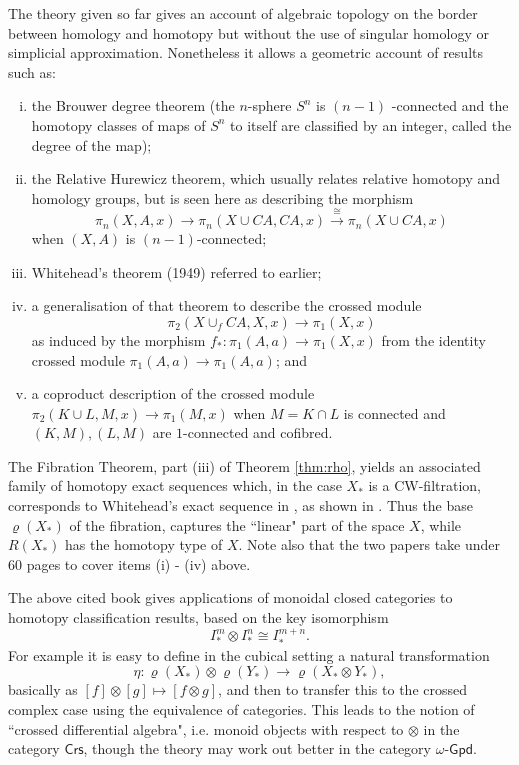 \documentclass{elsarticle}
\def\Crs{\mathsf{Crs}}
\def\Crs{\mathsf{Crs}}
\def\Crs{\mathsf{Crs}}
\def\rho{\varrho}
\def\ogpd{$\omega$-$\mathsf{Gpd}$}
\begin{document}
The theory given so far gives an account of algebraic topology on the border between
homology and homotopy but without the use of singular homology or simplicial approximation.
Nonetheless it allows a geometric account of results such as:
\begin{enumerate}[(i)]
\item  the Brouwer degree theorem (the $n$-sphere $S ^n$  is $(n - 1)$ -connected and the homotopy
classes of maps of $S^ n$  to itself are classified by an integer, called the degree of the map);
\item   the Relative Hurewicz theorem, which usually relates relative homotopy and homology
groups, but is seen here as describing the morphism $$\pi_n(X, A, x) \to \pi_n(X \cup CA, CA,x) \xrightarrow{\cong} \pi_n (X \cup  CA, x)$$  when
$(X, A)$ is $(n - 1)$-connected;
\item   Whitehead's theorem (1949) referred to earlier;
\item   a generalisation of that theorem to describe the crossed module
$$ \pi_2(X \cup_ f CA, X, x) \to  \pi_ 1 (X, x)$$
as induced by the morphism $f_* : \pi_1(A, a) \to  \pi_ 1 (X, x)$  from the identity crossed module
$\pi_ 1 (A, a) \to \pi _1 (A, a)$; and
\item  a coproduct description of the crossed module $\pi_ 2 (K \cup L, M, x) \to  \pi_1 (M, x)$  when $M =
K \cap L$ is connected and $(K, M), (L, M)$ are $1$-connected and cofibred.
\end{enumerate}
The Fibration Theorem, part (iii) of Theorem \ref{thm:rho}, yields  an associated family of  homotopy exact
sequences which, in the case $X_*$  is a CW-filtration, corresponds to Whitehead's exact
sequence in \cite{W50}, as shown in \cite[Theorem 14.7.9]{BHS}.  Thus the base $\rho(X_*)$ of the fibration, captures
 the ``linear" part of the space $X$, while $R(X_* )$  has the homotopy type of $X$. Note also that the two papers  \cite{BH81algcub,BH81:col} take under 60 pages to cover items (i) - (iv) above.

The above cited book  gives applications of monoidal closed categories to homotopy classification
results, based on the key isomorphism $$I^ m_* \otimes I^n_* \cong I^{ m+n}_*. $$ For example it is easy to define in the
cubical setting a natural transformation
$$\eta  : \rho(X_* ) \otimes \rho(Y _* ) \to \rho(X_*\otimes  Y_* ),$$
basically as $[f] \otimes  [g] \mapsto  [f \otimes g]$, and then to transfer this to the crossed complex case using the
equivalence of categories. This leads to the notion of ``crossed differential algebra", i.e. monoid objects with respect to $\otimes$
in the category $\Crs$, though the theory may work out better in the category \ogpd.
\end{document}
